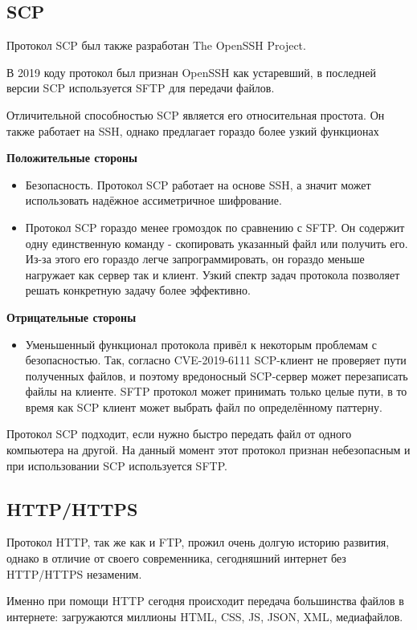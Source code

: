 \documentclass[a4paper,14pt]{extarticle}
\begin{document}
\subsection{SCP}
Протокол SCP был также разработан The OpenSSH Project.

В 2019 коду протокол был признан OpenSSH как устаревший, в последней версии 
SCP используется SFTP для передачи файлов. 

Отличительной способностью SCP является его относительная простота. Он также
работает на SSH, однако предлагает гораздо более узкий функционах

\textbf{Положительные стороны}\\
\begin{itemize}
\item Безопасность. Протокол SCP работает на основе SSH, а значит может использовать надёжное
ассиметричное шифрование. 
\item Протокол SCP гораздо менее громоздок по сравнению с SFTP. Он содержит одну единственную 
команду - скопировать указанный файл или получить его. Из-за этого его гораздо легче
запрограммировать, он гораздо меньше нагружает как сервер так и клиент. Узкий спектр
задач протокола позволяет решать конкретную задачу более эффективно.
\end{itemize}
\textbf{Отрицательные стороны}\\
\begin{itemize}
\item Уменьшенный функционал протокола привёл к некоторым проблемам с безопасностью. Так, согласно
CVE-2019-6111 SCP-клиент не проверяет пути полученных файлов, и поэтому вредоносный SCP-сервер 
может перезаписать файлы на клиенте. SFTP протокол может принимать только целые пути, в то время 
как SCP клиент может выбрать файл по определённому паттерну.
\end{itemize}

Протокол SCP подходит, если нужно быстро передать файл от одного компьютера на другой. На данный 
момент этот протокол признан небезопасным и при использовании SCP используется SFTP. 

\subsection{HTTP/HTTPS}
Протокол HTTP, так же как и FTP, прожил очень долгую историю развития, однако в отличие
от своего современника, сегодняшний интернет без HTTP/HTTPS незаменим.

Именно при помощи HTTP сегодня происходит передача большинства файлов в интернете: 
загружаются миллионы HTML, CSS, JS, JSON, XML, медиафайлов. 
\end{document}
